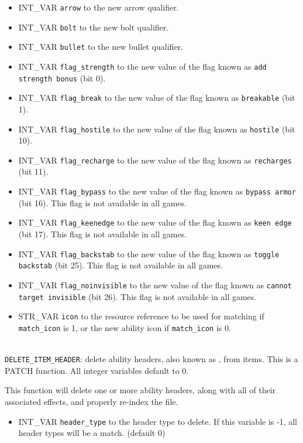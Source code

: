 \documentclass{article}
\def\t#1{{\tt #1}}
\begin{document}
\begin{itemize}
\item INT_VAR \verb+arrow+ to the new arrow qualifier.
\item INT_VAR \verb+bolt+ to the new bolt qualifier.
\item INT_VAR \verb+bullet+ to the new bullet qualifier.
\item INT_VAR \verb+flag_strength+ to the new value of the flag known as \t{add strength bonus} (bit 0).
\item INT_VAR \verb+flag_break+ to the new value of the flag known as \t{breakable} (bit 1).
\item INT_VAR \verb+flag_hostile+ to the new value of the flag known as \t{hostile} (bit 10).
\item INT_VAR \verb+flag_recharge+ to the new value of the flag known as \t{recharges} (bit 11).
\item INT_VAR \verb+flag_bypass+ to the new value of the flag known as \t{bypass armor} (bit 16). This flag is not available in all games.
\item INT_VAR \verb+flag_keenedge+ to the new value of the flag known as \t{keen edge} (bit 17). This flag is not available in all games.
\item INT_VAR \verb+flag_backstab+ to the new value of the flag known as \t{toggle backstab} (bit 25). This flag is not available in all games.
\item INT_VAR \verb+flag_noinvisible+ to the new value of the flag known as \t{cannot target invisible} (bit 26). This flag is not available in all games.
\item STR_VAR \verb+icon+ to the resource reference to be used for matching if \verb+match_icon+ is 1, or the new ability icon if \verb+match_icon+ is 0.
\end{itemize}
\\

\verb+DELETE_ITEM_HEADER+: delete ability headers, also known as , from items. This is a PATCH function. All integer variables default to 0.

This function will delete one or more ability headers, along with all of their associated effects, and properly re-index the file.

\begin{itemize}
\item INT_VAR \verb+header_type+ to the header type to delete. If this variable is -1, all header types will be a match. (default 0)
\end{itemize}
\\
\end{document}
